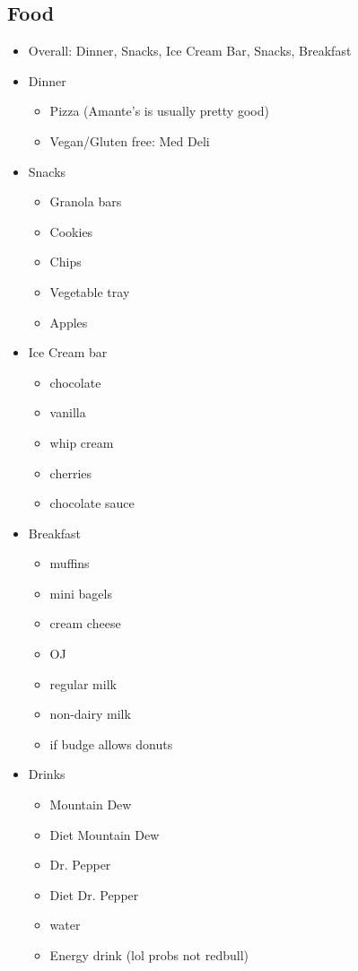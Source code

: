 \documentclass[a4paper]{article}
\begin{document}
\subsection{Food}
\begin{itemize}
\item Overall: Dinner, Snacks, Ice Cream Bar, Snacks, Breakfast
\item Dinner
\begin{itemize}
\item Pizza (Amante’s is usually pretty good)
\item Vegan/Gluten free: Med Deli
\end{itemize}
\item Snacks
\begin{itemize}
\item Granola bars
\item Cookies
\item Chips
\item Vegetable tray
\item Apples 
\end{itemize}
\item Ice Cream bar
\begin{itemize}
\item chocolate
\item vanilla
\item whip cream
\item cherries
\item chocolate sauce
\end{itemize}
\item Breakfast
\begin{itemize}
\item muffins
\item mini bagels
\item cream cheese
\item OJ
\item regular milk
\item non-dairy milk
\item if budge allows donuts
\end{itemize}
\item Drinks
\begin{itemize}
\item Mountain Dew
\item Diet Mountain Dew
\item Dr. Pepper
\item Diet Dr. Pepper
\item water
\item Energy drink (lol probs not redbull)
\end{itemize}
\end{itemize}
\end{document}
